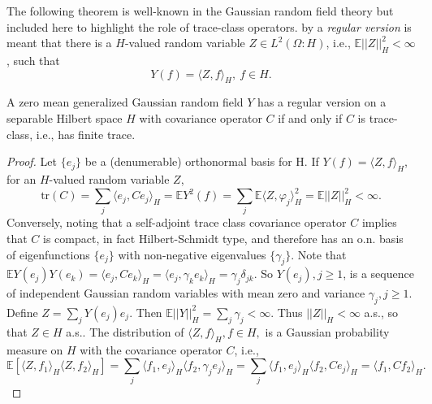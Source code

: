 \documentclass[11pt]{article}
\numberwithin{equation}{section}
\theoremstyle{definition}
\theoremstyle{remark}
\theoremstyle{definition}
\begin{document}
The following theorem is well-known in the Gaussian
random field theory but included here to highlight the
role of trace-class operators.  
by a {\it regular version} is
meant that  there is a $H$-valued 
random variable $Z\in L^2(\Omega:H)$, i.e.,
${\mathbb E}||Z||^2_H<\infty$,  such
that 
\begin{equation*}
Y(f) = \langle Z,f\rangle_H, \ f\in H.
\end{equation*}


\begin{thm}\label{regthm}
A zero mean generalized Gaussian random field $Y$ 
has a regular version
 on a separable Hilbert space $H$ with covariance
operator $C$ if and only if $C$ is trace-class, i.e., has finite trace.
\end{thm}
\begin{proof}  Let $\{e_j\}$ be a (denumerable) orthonormal basis for H.
If $Y(f) = \langle Z,f\rangle_H$, for an $H$-valued
random variable $Z$,
\begin{equation*}
\text{tr}(C) = \sum_j \langle e_j,Ce_j\rangle_H
= {\mathbb E}Y^2(f)
=\sum_j{\mathbb E}\langle Z,\varphi_j\rangle_H^2
= {\mathbb E}||Z||_H^2<\infty.
\end{equation*}
Conversely, noting that a self-adjoint trace class covariance operator $C$
implies that $C$ is compact, in fact Hilbert-Schmidt type, and therefore has an o.n. basis of
eigenfunctions $\{e_j\}$ with non-negative eigenvalues $\{\gamma_j\}$.
Note that $\mathbb{E}Y(e_j)Y(e_k) = \langle e_j,Ce_k\rangle_H
= \langle e_j,\gamma_ke_k\rangle_H=  \gamma_j\delta_{jk}$.
So $Y(e_j), j\ge 1$, is a sequence of independent Gaussian random
variables with mean zero and variance $\gamma_j, j\ge 1$.
 Define $Z=\sum_jY(e_j)e_j$.
Then $\mathbb{E}||Y||_H^2 = \sum_j\gamma_j <\infty$. 
Thus $||Z||_H<\infty$ a.s., so that $Z\in H$ a.s..  The distribution
of $\langle Z,f\rangle_H, f\in H,$ is a Gaussian probability measure on $H$ with
the covariance operator $C$, i.e., 
\begin{equation}\mathbb{E}[\langle Z,f_1\rangle_H
\langle Z,f_2\rangle_H] = \sum_j\langle f_1,e_j\rangle_H\langle f_2,
\gamma_je_j\rangle_H = \sum_j\langle f_1,e_j\rangle_H\langle f_2,Ce_j\rangle_H = \langle f_1,Cf_2\rangle_H.\end{equation}
\end{proof}
\end{document}

